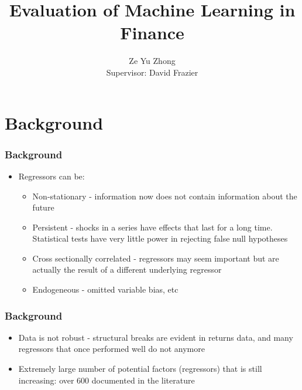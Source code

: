 \documentclass[]{beamer}
\title{Evaluation of Machine Learning in Finance}
\author{
	Ze Yu Zhong \\
	Supervisor: David Frazier
}
\institute{Monash University}
\begin{document}
	
\begin{frame}[plain]
    \maketitle
\end{frame}

\section{Background}


\begin{frame}
\frametitle{Background}
\begin{itemize}
	\item Regressors can be:
		\begin{itemize}
			\item Non-stationary - information now does not contain information about the future
			\item Persistent - shocks in a series have effects that last for a long time. Statistical tests have very little power in rejecting false null hypotheses
			\item Cross sectionally correlated - regressors may seem important but are actually the result of a different underlying regressor
			\item Endogeneous - omitted variable bias, etc
		\end{itemize}
\end{itemize}
\end{frame}

\begin{frame}
\frametitle{Background}
\begin{itemize}
	\item Data is not robust - structural breaks are evident in returns data, and many regressors that once performed well do not anymore
	\item Extremely large number of potential factors (regressors) that is still increasing: over 600 documented in the literature \cite{harvey_census_2019}
\end{itemize}
\end{frame}

\end{document}
